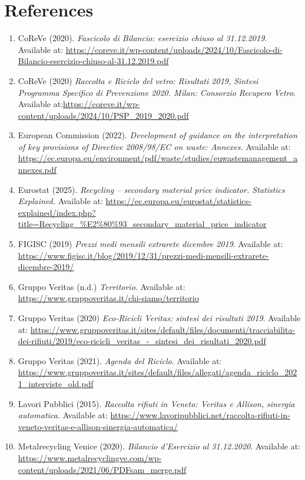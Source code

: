 \documentclass[10pt,a4paper]{article}
\begin{document}
\section{References}
\begin{enumerate}
    \item CoReVe (2020). \textit{Fascicolo di Bilancio: esercizio chiuso al 31.12.2019}. Available at: \url{https://coreve.it/wp-content/uploads/2024/10/Fascicolo-di-Bilancio-esercizio-chiuso-al-31.12.2019.pdf}
    \item CoReVe (2020) \textit{Raccolta e Riciclo del vetro: Risultati 2019, Sintesi Programma Specifico di Prevenzione 2020. Milan: Consorzio Recupero Vetro}. Available at:\url{https://coreve.it/wp-content/uploads/2024/10/PSP_2019_2020.pdf}
    \item European Commission (2022). \textit{Development of guidance on the interpretation of key provisions of Directive 2008/98/EC on waste: Annexes.} Available at: \url{https://ec.europa.eu/environment/pdf/waste/studies/euwastemanagement_annexes.pdf}
    \item Eurostat (2025). \textit{Recycling – secondary material price indicator. Statistics Explained.} Available at: \url{https://ec.europa.eu/eurostat/statistics-explained/index.php?title=Recycling_%E2%80%93_secondary_material_price_indicator}
    \item FIGISC (2019) \textit{Prezzi medi mensili extrarete dicembre 2019}. Available at: \url{https://www.figisc.it/blog/2019/12/31/prezzi-medi-mensili-extrarete-dicembre-2019/}
    \item Gruppo Veritas (n.d.) \textit{Territorio}. Available at: \url{https://www.gruppoveritas.it/chi-siamo/territorio}
    \item Gruppo Veritas (2020) \textit{Eco-Ricicli Veritas: sintesi dei risultati 2019}. Available at: \url{https://www.gruppoveritas.it/sites/default/files/documenti/tracciabilita-dei-rifiuti/2019/eco-ricicli_veritas_-_sintesi_dei_risultati_2020.pdf}
    \item Gruppo Veritas (2021). \textit{Agenda del Riciclo}. Available at: \url{https://www.gruppoveritas.it/sites/default/files/allegati/agenda_riciclo_2021_interviste_old.pdf}
    \item Lavori Pubblici (2015). \textit{Raccolta rifiuti in Veneto: Veritas e Allison, sinergia automatica.} Available at: \url{https://www.lavoripubblici.net/raccolta-rifiuti-in-veneto-veritas-e-allison-sinergia-automatica/}
    \item Metalrecycling Venice (2020). \textit{Bilancio d'Esercizio al 31.12.2020}. Available at: \url{https://www.metalrecyclingve.com/wp-content/uploads/2021/06/PDFsam_merge.pdf}

\end{enumerate}
\end{document}

